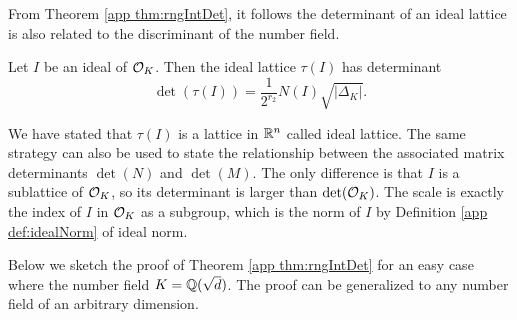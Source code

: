 \documentclass[../main.tex]{subfiles}
\begin{document}
From Theorem \ref{app thm:rngIntDet}, it follows the determinant of an ideal lattice is also related to the discriminant of the number field. 

\begin{corollary}
\label{app cor:idealLatDet}
Let $I$ be an ideal of $\mathcal{O}_K$. Then the ideal lattice $\tau(I)$ has determinant  
\reversemarginpar
{}
\begin{equation*}
    \det(\tau(I)) = \frac{1}{2^{r_2}}N(I) \sqrt{|\Delta_K|}.
\end{equation*}
\end{corollary}
We have stated that $\tau(I)$ is a lattice in $\mathbb{R}^n$ called ideal lattice. The same strategy can also be used to state the relationship between the associated matrix determinants $\det(N)$ and $\det(M)$. The only difference is that $I$ is a sublattice of $\mathcal{O}_K$, so its determinant is larger than $\det(\mathcal{O}_K)$. The scale is exactly the index of $I$ in $\mathcal{O}_K$ as a subgroup, which is the norm of $I$ by Definition \ref{app def:idealNorm} of ideal norm. 

\iffalse 
Below we sketch the proof of Theorem \ref{app thm:rngIntDet} for an easy case where the number field $K=\mathbb{Q}(\sqrt{d})$. The proof can be generalized to any number field of an arbitrary dimension. 
\end{document}
